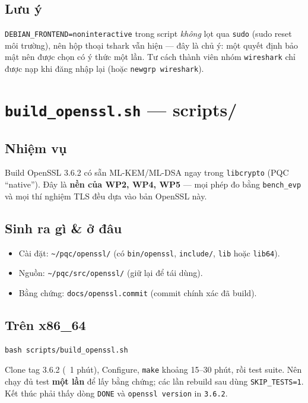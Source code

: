 \documentclass[11pt,a4paper]{article}
\begin{document}
\subsection*{Lưu ý}
\verb|DEBIAN_FRONTEND=noninteractive| trong script \emph{không} lọt qua \verb|sudo| (sudo reset môi trường), nên hộp thoại tshark vẫn hiện — đây là chủ ý: một quyết định bảo mật nên được chọn có ý thức một lần. Tư cách thành viên nhóm \verb|wireshark| chỉ được nạp khi đăng nhập lại (hoặc \verb|newgrp wireshark|).

\section{\texttt{build\_openssl.sh} — \textmd{\normalsize scripts/}}

\subsection*{Nhiệm vụ}
Build OpenSSL 3.6.2 có sẵn ML-KEM/ML-DSA ngay trong \verb|libcrypto| (PQC ``native''). Đây là \textbf{nền của WP2, WP4, WP5} — mọi phép đo bằng \verb|bench_evp| và mọi thí nghiệm TLS đều dựa vào bản OpenSSL này.

\subsection*{Sinh ra gì \& ở đâu}
\begin{itemize}
  \item Cài đặt: \verb|~/pqc/openssl/| (có \verb|bin/openssl|, \verb|include/|, \verb|lib| hoặc \verb|lib64|).
  \item Nguồn: \verb|~/pqc/src/openssl/| (giữ lại để tái dùng).
  \item Bằng chứng: \verb|docs/openssl.commit| (commit chính xác đã build).
\end{itemize}

\subsection*{Trên x86\_64}
\begin{lstlisting}
bash scripts/build_openssl.sh
\end{lstlisting}
Clone tag 3.6.2 (~1 phút), Configure, \verb|make| khoảng 15–30 phút, rồi test suite. Nên chạy đủ test \textbf{một lần} để lấy bằng chứng; các lần rebuild sau dùng \verb|SKIP_TESTS=1|. Kết thúc phải thấy dòng \verb|DONE| và \verb|openssl version| in \verb|3.6.2|.
\end{document}
